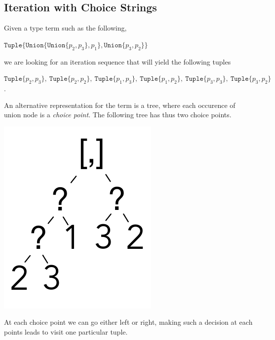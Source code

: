 \documentclass[a4paper,english]{lipics-v2019}
\newcommand{\xt}[1]{\texttt{#1}}
\newcommand{\union}[2]{\xt{Union\{}#1,#2\xt{\}}}
\newcommand{\tuple}[1]{\xt{Tuple\{}#1\xt{\}}}
\begin{document}
\subsection{Iteration with Choice Strings}\label{cs}

Given a type term such as the following,

\medskip
$\tuple{ \union{ \union{p_2}{p_3} }{p_1}, \union{p_3}{p_2}}$
\medskip

\noindent
we are looking for an iteration sequence that will yield the following tuples

\medskip
\noindent $\tuple{p_2,p_3}, ~ \tuple{p_2,p_2}, ~ \tuple{p_1,p_3}, ~ \tuple{p_1,p_2}, ~
  \tuple{p_3,p_3}, ~ \tuple{p_3,p_2}$.
\medskip\vspace{-3mm}

\noindent
An alternative representation for the term is a tree, where each occurence
of union node is a \emph{choice point}. The following tree has thus two
choice points.
\smallskip

\includegraphics[scale=.25]{figures/tree1.pdf}
\smallskip

\noindent
At each choice point we can go either left or right, making such a decision
at each points leads to visit one particular tuple.
\end{document}
